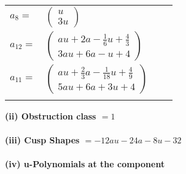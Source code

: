 \documentclass[1p]{elsarticle_modified}
\theoremstyle{definition}
\begin{document}
\begin{tabular}{m{7pt} m{180pt} m{7pt} m{180pt} }
\flushright $a_{8}=$&$\begin{pmatrix}u\\3 u\end{pmatrix}$ \\
\flushright $a_{12}=$&$\begin{pmatrix}a u+2 a-\frac{1}{6} u+\frac{4}{3}\\3 a u+6 a- u+4\end{pmatrix}$ \\
\flushright $a_{11}=$&$\begin{pmatrix}a u+\frac{2}{3} a-\frac{1}{18} u+\frac{4}{9}\\5 a u+6 a+3 u+4\end{pmatrix}$\\&\end{tabular}
\flushleft \textbf{(ii) Obstruction class $= 1$}\\~\\
\flushleft \textbf{(iii) Cusp Shapes $= -12 a u-24 a-8 u-32$}\\~\\
\newpage\renewcommand{\arraystretch}{1}
\flushleft \textbf{(iv) u-Polynomials at the component}\newline \\
\end{document}
